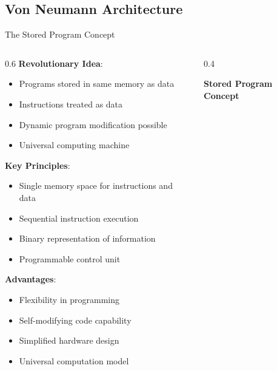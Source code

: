 \documentclass[aspectratio=169]{beamer}
\newcommand{\concept}[1]{\textbf{\color{darkblue}#1}}
\begin{document}
\subsection{Von Neumann Architecture}

\begin{frame}{The Stored Program Concept}
\begin{columns}
\begin{column}{0.6\textwidth}
\concept{Revolutionary Idea}:
\begin{itemize}
\item Programs stored in same memory as data
\item Instructions treated as data
\item Dynamic program modification possible
\item Universal computing machine
\end{itemize}

\vspace{0.3cm}
\concept{Key Principles}:
\begin{itemize}
\item Single memory space for instructions and data
\item Sequential instruction execution
\item Binary representation of information
\item Programmable control unit
\end{itemize}

\vspace{0.3cm}
\concept{Advantages}:
\begin{itemize}
\item Flexibility in programming
\item Self-modifying code capability
\item Simplified hardware design
\item Universal computation model
\end{itemize}
\end{column}
\begin{column}{0.4\textwidth}
\begin{center}
\textbf{Stored Program Concept}
\vspace{0.3cm}

\end{center}
\end{column}
\end{columns}
\end{frame}
\end{document}
